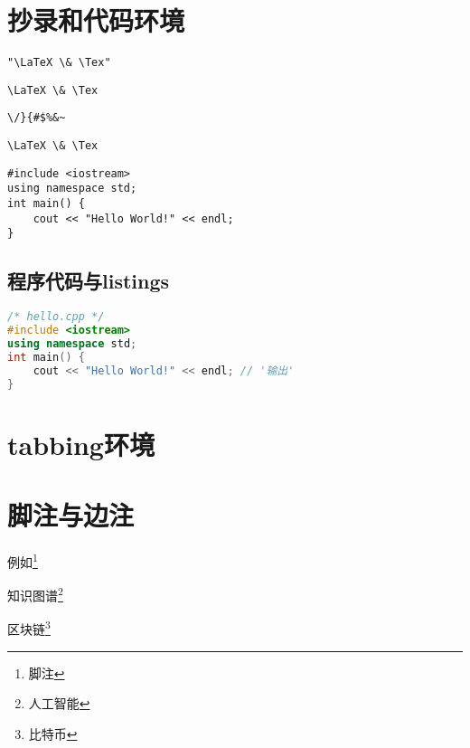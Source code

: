 \documentclass{ctexart}
\theoremstyle{marginbreak}
\begin{document}


\section{抄录和代码环境}


\verb|"\LaTeX \& \Tex"|\par
\verb"\LaTeX \& \Tex"\par
\verb!\/}{#$%&~!\par
\verb*|\LaTeX \& \Tex|

\begin{verbatim}
#include <iostream>
using namespace std;
int main() {
    cout << "Hello World!" << endl;
}
\end{verbatim}

\subsection{程序代码与listings}

\begin{lstlisting}[language=C++]
/* hello.cpp */
#include <iostream>
using namespace std;
int main() {
    cout << "Hello World!" << endl;	// '输出'
}
\end{lstlisting}


\section{tabbing环境}



\section{脚注与边注}

例如\footnote{脚注}

知识图谱\footnote[1]{人工智能}

区块链\footnote{比特币}
\end{document}
